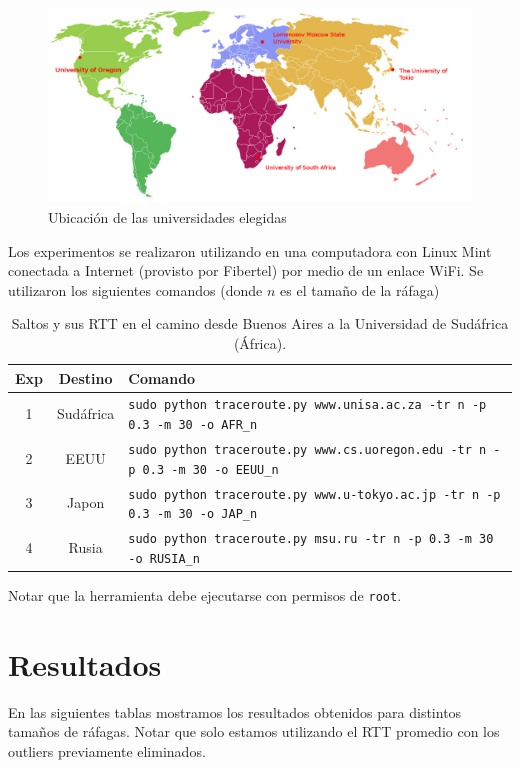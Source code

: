  
\begin{figure}[H]
  \centering
  \includegraphics[scale = 0.3]{imagenes/mapa.png}
  \caption{Ubicación de las universidades elegidas}
  \label{histogramaprobabilidadesModel1}
\end{figure}


Los experimentos se realizaron utilizando en una computadora con Linux Mint conectada a Internet (provisto por Fibertel) por medio de un enlace WiFi. Se utilizaron los siguientes comandos (donde $n$ es el tamaño de la ráfaga) 
\begin{table}[]
\centering
\caption{Saltos y sus RTT en el camino desde Buenos Aires a la Universidad de Sudáfrica (África).}
\begin{tabular}{ | c | c | l |}
	\hline 
Exp & Destino & Comando\\ \hline
 1 & Sudáfrica & \texttt{sudo python traceroute.py www.unisa.ac.za -tr n -p 0.3 -m 30 -o AFR\_n} \\ 
  2 & EEUU& \texttt{sudo python traceroute.py www.cs.uoregon.edu -tr n -p 0.3 -m 30 -o EEUU\_n} \\ 
  3 & Japon& \texttt{sudo python traceroute.py www.u-tokyo.ac.jp -tr n -p 0.3 -m 30 -o JAP\_n} \\ 
  4 & Rusia & \texttt{sudo python traceroute.py msu.ru -tr n -p 0.3 -m 30 -o RUSIA\_n} \\ 
  \hline

\end{tabular}
\end{table}
  Notar que la herramienta debe ejecutarse con permisos de \texttt{root}.
  
\section{Resultados}

En las siguientes tablas mostramos los resultados obtenidos para distintos tamaños de ráfagas. Notar que solo estamos utilizando el RTT promedio con los outliers previamente eliminados.

